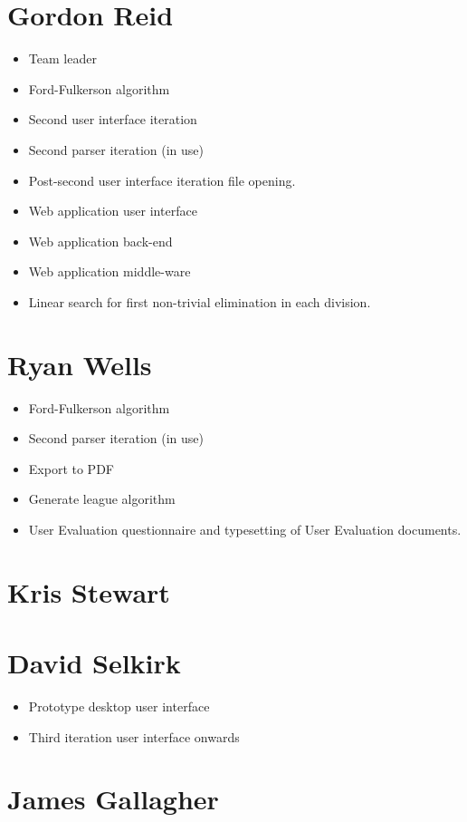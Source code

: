 \section{Gordon Reid}

\begin{itemize}
\item Team leader
\item Ford-Fulkerson algorithm
\item Second user interface iteration
\item Second parser iteration (in use)
\item Post-second user interface iteration file opening.
\item Web application user interface
\item Web application back-end
\item Web application middle-ware
\item Linear search for first non-trivial elimination in each division.
\end{itemize}

\section{Ryan Wells}

\begin{itemize}
\item Ford-Fulkerson algorithm
\item Second parser iteration (in use)
\item Export to PDF
\item Generate league algorithm
\item User Evaluation questionnaire and typesetting of User Evaluation documents.
\end{itemize}

\section{Kris Stewart}

\section{David Selkirk}

\begin{itemize}
\item Prototype desktop user interface
\item Third iteration user interface onwards
\end{itemize}

\section{James Gallagher}
